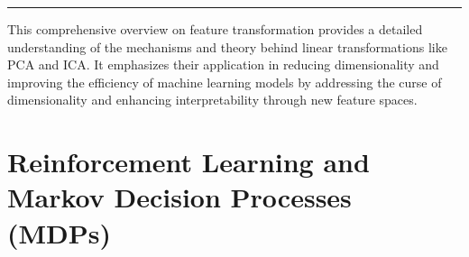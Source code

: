 \documentclass[
  12pt,
]{report}
\begin{document}
\begin{center}\rule{0.5\linewidth}{0.5pt}\end{center}

This comprehensive overview on feature transformation provides a detailed understanding of the mechanisms and theory behind linear transformations like PCA and ICA. It emphasizes their application in reducing dimensionality and improving the efficiency of machine learning models by addressing the curse of dimensionality and enhancing interpretability through new feature spaces.

\chapter{Reinforcement Learning and Markov Decision Processes (MDPs)}
\end{document}
